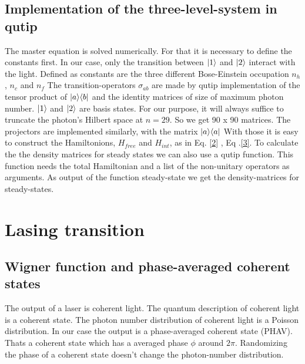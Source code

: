 \documentclass[12pt,a4paper]{article}
\DeclarePairedDelimiter\bra{\langle}{\rvert}
\DeclarePairedDelimiter\ket{\lvert}{\rangle}
\begin{document}
\subsection{Implementation of the three-level-system in qutip}
The master equation is solved numerically. For that it is necessary to define the constants first.
In our case, only the transition between $\ket{1}$ and $\ket{2}$ interact with the light. 
Defined as constants are the three different Bose-Einstein occupation $n_h$, $n_c$ and $n_f$
The transition-operators $\sigma_{ab}$ are  made by qutip \cite{Nation2022} implementation of the tensor product of $\ket{a}\bra{b}$ and the identity matrices of size of maximum photon number. 
$\ket{1}$ and $\ket{2}$ are basis states. For our purpose, it will  always suffice to truncate the photon's Hilbert space at $n=29$. So we get  90 x 90 matrices. 
The projectors are implemented similarly, with the matrix $\ket{a}\bra{a}$
With those it is easy to construct the Hamiltonions, $H_{free}$ and $H_{int}$, as in Eq. \eqref{2} , Eq .\eqref{3}.
To calculate the the density matrices for steady states we can also use a qutip function.
This function needs the total Hamiltonian and a list of the non-unitary operators as arguments.
As output of the function steady-state we get the density-matrices for steady-states. \cite{Nation2022}
\section{Lasing transition}

\subsection{Wigner function and phase-averaged coherent states}
The output of a laser is coherent light.
The quantum description of coherent light is a coherent state. The photon number distribution of coherent light is a Poisson distribution.
In our case the output is a phase-averaged coherent state (PHAV). 
Thats a coherent state which has a averaged phase $\phi$ around $2\pi$.
Randomizing the phase of a coherent state doesn't change the photon-number distribution. \\
\end{document}
